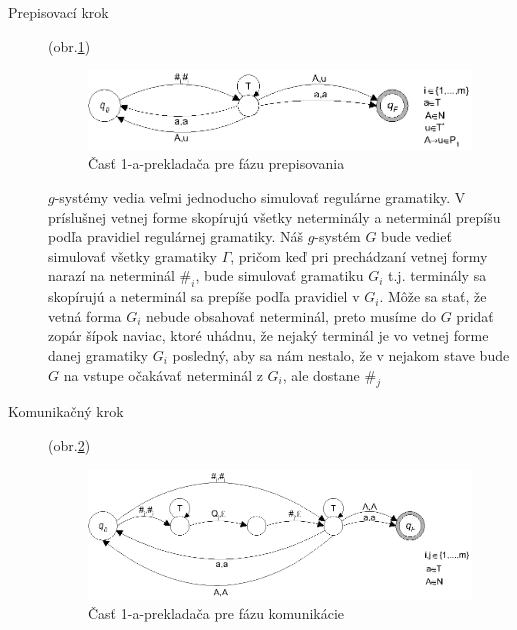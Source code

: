 \begin{dokaz}
\begin{description}
  \item[Prepisovací krok] (obr.\ref{pcgsgs2})
\begin{figure}[ht]
  \centering
  \includegraphics{img/pcgsgs/pcgsgs2}
  \caption{Časť 1-a-prekladača pre fázu prepisovania}\label{pcgsgs2}
\end{figure}

  $g$-systémy vedia veľmi jednoducho simulovať regulárne
  gramatiky. V príslušnej vetnej forme skopírujú všetky
  neterminály a neterminál prepíšu podľa pravidiel regulárnej
  gramatiky. Náš $g$-systém $G$ bude vedieť simulovať všetky gramatiky
  $\Gamma$, pričom keď pri prechádzaní vetnej formy narazí na
  neterminál $\#_i$, bude simulovať gramatiku $G_i$ t.j. terminály
  sa skopírujú a neterminál sa prepíše podľa pravidiel v $G_i$.
  Môže sa stať, že vetná forma $G_i$ nebude obsahovať neterminál,
  preto musíme do $G$ pridať zopár šípok naviac, ktoré uhádnu, že
  nejaký terminál je vo vetnej forme danej gramatiky $G_i$
  posledný, aby sa nám nestalo, že v nejakom stave bude $G$
  na vstupe očakávať neterminál z $G_i$, ale dostane $\#_j$

  \item[Komunikačný krok] (obr.\ref{pcgsgs3})
\begin{figure}[ht]
  \centering
  \includegraphics{img/pcgsgs/pcgsgs3}
  \caption{Časť 1-a-prekladača pre fázu komunikácie}\label{pcgsgs3}
\end{figure}


\end{description}
\end{dokaz}
